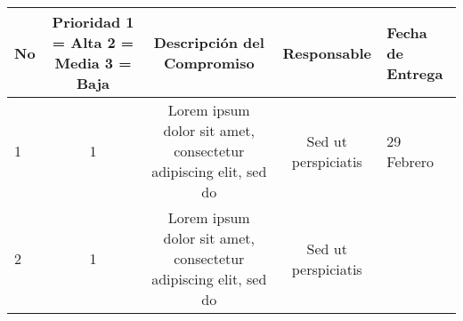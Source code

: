 \documentclass[]{book}
\begin{document}
\begin{longtable}[]{@{}lcccl@{}}
\toprule
\begin{minipage}[b]{0.03\columnwidth}\raggedright\strut
No\strut
\end{minipage} & \begin{minipage}[b]{0.23\columnwidth}\centering\strut
Prioridad 1 = Alta 2 = Media 3 = Baja\strut
\end{minipage} & \begin{minipage}[b]{0.37\columnwidth}\centering\strut
Descripción del Compromiso\strut
\end{minipage} & \begin{minipage}[b]{0.12\columnwidth}\centering\strut
Responsable\strut
\end{minipage} & \begin{minipage}[b]{0.11\columnwidth}\raggedright\strut
Fecha de Entrega\strut
\end{minipage}\tabularnewline
\midrule
\endhead
\begin{minipage}[t]{0.03\columnwidth}\raggedright\strut
1\strut
\end{minipage} & \begin{minipage}[t]{0.23\columnwidth}\centering\strut
1\strut
\end{minipage} & \begin{minipage}[t]{0.37\columnwidth}\centering\strut
Lorem ipsum dolor sit amet, consectetur adipiscing elit, sed do\strut
\end{minipage} & \begin{minipage}[t]{0.12\columnwidth}\centering\strut
Sed ut perspiciatis\strut
\end{minipage} & \begin{minipage}[t]{0.11\columnwidth}\raggedright\strut
29 Febrero\strut
\end{minipage}\tabularnewline
\begin{minipage}[t]{0.03\columnwidth}\raggedright\strut
2\strut
\end{minipage} & \begin{minipage}[t]{0.23\columnwidth}\centering\strut
1\strut
\end{minipage} & \begin{minipage}[t]{0.37\columnwidth}\centering\strut
Lorem ipsum dolor sit amet, consectetur adipiscing elit, sed do\strut
\end{minipage} & \begin{minipage}[t]{0.12\columnwidth}\centering\strut
Sed ut perspiciatis\strut
\end{minipage} & \begin{minipage}[t]{0.11\columnwidth}\raggedright\strut

\end{minipage}
\end{longtable}
\end{document}
